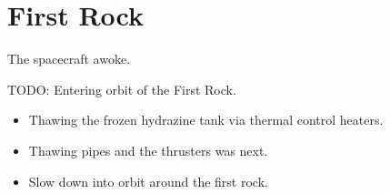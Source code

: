 %
%

\chapter{First Rock}

The spacecraft awoke.

TODO: Entering orbit of the First Rock.

\begin{itemize}
\item Thawing the frozen hydrazine tank via thermal control heaters.
\item Thawing pipes and the thrusters was next.
\item Slow down into orbit around the first rock.
\end{itemize}


\newpage
\thispagestyle{empty}
